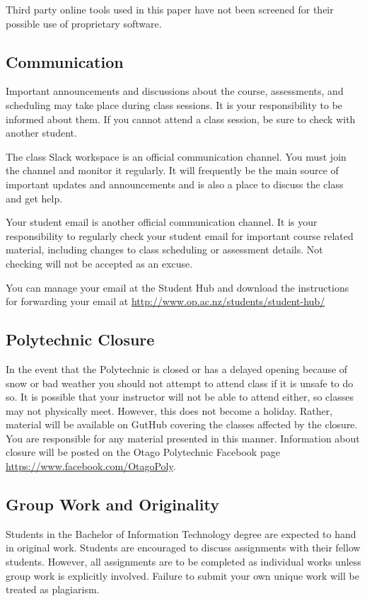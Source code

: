 \documentclass{article}
\begin{document}
Third party online tools used in this paper have not been screened for their possible use of proprietary software.
\subsection*{Communication}
Important announcements and discussions about the course, assessments, and scheduling may take place during class sessions.  It is your responsibility to be informed about them.  If you cannot attend a class session, be sure to check with another student.

The class Slack workspace is an official communication channel. You must join the channel and monitor it regularly. It will frequently be the main source of important updates and announcements and is also a place to discuss the class and get help.

Your student email is another official communication channel. It is your responsibility to regularly check your student email for important course related material, including changes to class scheduling or assessment details. Not checking will not be accepted as an excuse.

You can manage your email at the Student Hub and download the instructions for forwarding your email at \url{http://www.op.ac.nz/students/student-hub/}

\subsection*{Polytechnic Closure}
In the event that the Polytechnic is closed or has a delayed opening because of snow or bad weather you should not attempt to attend class if it is unsafe to do so. It is possible that your instructor will not be able to attend either, so classes may not physically meet. However, this does not become a holiday. Rather, material will be available on GutHub covering the classes affected by the closure. You are responsible for any material presented in this manner. Information about closure will be posted on the Otago Polytechnic Facebook page \url{https://www.facebook.com/OtagoPoly}.

\subsection*{Group Work and Originality}
Students in the Bachelor of Information Technology degree are expected to hand in original work.  
Students are encouraged to discuss assignments with their fellow students.  However, all assignments 
are to be completed as individual works unless group work is explicitly involved.
Failure to submit your own unique work will be treated as plagiarism.
\end{document}
